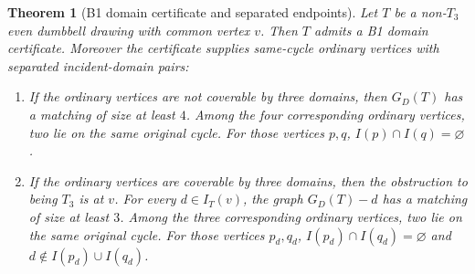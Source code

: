 \documentclass[11pt]{amsart}
\newtheorem{theorem}{Theorem}[section]
\theoremstyle{definition}
\begin{document}
\begin{theorem}[B1 domain certificate and separated endpoints]
Let \(T\) be a non-\(T_3\) even dumbbell drawing with common vertex \(v\). Then \(T\) admits a B1 domain certificate. Moreover the certificate supplies same-cycle ordinary vertices with separated incident-domain pairs:

\begin{enumerate}
\item If the ordinary vertices are not coverable by three domains, then \(G_D(T)\) has a matching of size at least \(4\). Among the four corresponding ordinary vertices, two lie on the same original cycle. For those vertices \(p,q\), \(I(p)\cap I(q)=\varnothing\).
\item If the ordinary vertices are coverable by three domains, then the obstruction to being \(T_3\) is at \(v\). For every \(d\in I_T(v)\), the graph \(G_D(T)-d\) has a matching of size at least \(3\). Among the three corresponding ordinary vertices, two lie on the same original cycle. For those vertices \(p_d,q_d\), \(I(p_d)\cap I(q_d)=\varnothing\) and \(d\notin I(p_d)\cup I(q_d)\).
\end{enumerate}

\end{theorem}
\end{document}
